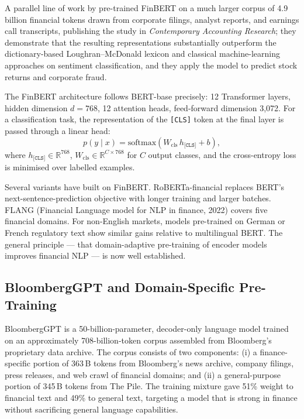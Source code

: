 \begin{context}
A parallel line of work by \citet{huang2023finbert} pre-trained FinBERT on a
much larger corpus of 4.9 billion financial tokens drawn from corporate filings,
analyst reports, and earnings call transcripts, publishing the study in
\emph{Contemporary Accounting Research}; they demonstrate that the resulting
representations substantially outperform the dictionary-based Loughran--McDonald
lexicon and classical machine-learning approaches on sentiment classification,
and they apply the model to predict stock returns and corporate fraud.

The FinBERT architecture follows BERT-base precisely: 12 Transformer layers,
hidden dimension $d = 768$, 12 attention heads, feed-forward dimension 3{,}072.
For a classification task, the representation of the \texttt{[CLS]} token at
the final layer is passed through a linear head:
\begin{equation}
  p(y \mid x) = \mathrm{softmax}(W_{\mathrm{cls}} \, h_{\texttt{[CLS]}} + b),
  \label{eq:finbert-cls}
\end{equation}
where $h_{\texttt{[CLS]}} \in \mathbb{R}^{768}$, $W_{\mathrm{cls}} \in \mathbb{R}^{C \times 768}$
for $C$ output classes, and the cross-entropy loss is minimised over labelled examples.

\begin{remark}
\label{rem:finbert-alternatives}
Several variants have built on FinBERT.  RoBERTa-financial replaces BERT's
next-sentence-prediction objective with longer training and larger batches.
FLANG (Financial Language model for NLP in finance, 2022) covers five financial
domains.  For non-English markets, models pre-trained on German or French
regulatory text show similar gains relative to multilingual BERT.  The general
principle --- that domain-adaptive pre-training of encoder models improves
financial NLP --- is now well established.
\end{remark}

\subsection{BloombergGPT and Domain-Specific Pre-Training}
\label{subsec:bloomberggpt}

BloombergGPT \cite{wu2023bloomberggpt} is a 50-billion-parameter, decoder-only
language model trained on an approximately 708-billion-token corpus assembled
from Bloomberg's proprietary data archive.  The corpus consists of two
components: (i) a finance-specific portion of 363\,B tokens from Bloomberg's
news archive, company filings, press releases, and web crawl of financial
domains; and (ii) a general-purpose portion of 345\,B tokens from The Pile.
The training mixture gave 51\% weight to financial text and 49\% to general
text, targeting a model that is strong in finance without sacrificing general
language capabilities.


\end{context}
